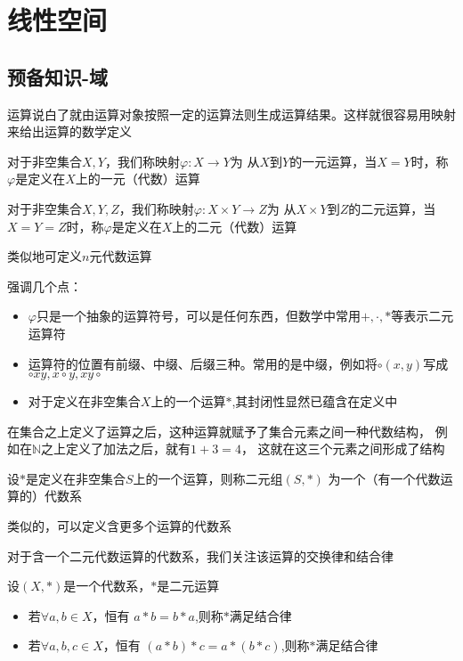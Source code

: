 \chapter{线性空间}
\section{预备知识-域}
运算说白了就由运算对象按照一定的运算法则生成运算结果。这样就很容易用映射来给出运算的数学定义
\begin{definition}
    对于非空集合$X,Y$，我们称映射$\varphi : X\rightarrow Y $为
    从$X$到$Y$的一元运算，当$X=Y$时，称$\varphi$是定义在$X$上的一元（代数）运算
\end{definition}
\begin{definition}
    对于非空集合$X,Y,Z$，我们称映射$\varphi : X \times Y \rightarrow Z $为
    从$X\times Y$到$Z$的二元运算，当$X=Y=Z$时，称$\varphi$是定义在$X$上的二元（代数）运算
\end{definition}

类似地可定义$n$元代数运算

强调几个点：
\begin{itemize}
    \item $\varphi$只是一个抽象的运算符号，可以是任何东西，但数学中常用$+,\cdot, * $等表示二元运算符
    \item 运算符的位置有前缀、中缀、后缀三种。常用的是中缀，例如将$\circ(x,y)$写成$\circ x y,x \circ y, x y \circ$
    \item 对于定义在非空集合$X$上的一个运算$*$,其封闭性显然已蕴含在定义中
\end{itemize}

在集合之上定义了运算之后，这种运算就赋予了集合元素之间一种代数结构，
例如在$\mathbb{N}$之上定义了加法之后，就有$1+3=4$，
这就在这三个元素之间形成了结构
\begin{definition}[代数系/系统/结构]
    设$*$是定义在非空集合$S$上的一个运算，则称二元组$(S,*)$
    为一个（有一个代数运算的）代数系
\end{definition}

类似的，可以定义含更多个运算的代数系

对于含一个二元代数运算的代数系，我们关注该运算的交换律和结合律
\begin{definition}
    设$(X,*)$是一个代数系，$*$是二元运算
    \begin{itemize}
        \item 若$\forall a,b \in X$，恒有
        $a*b=b*a$,则称$*$满足结合律
        \item 若$\forall a,b,c \in X$，恒有
        $(a*b)*c=a*(b*c)$,则称$*$满足结合律
    \end{itemize}
\end{definition}


